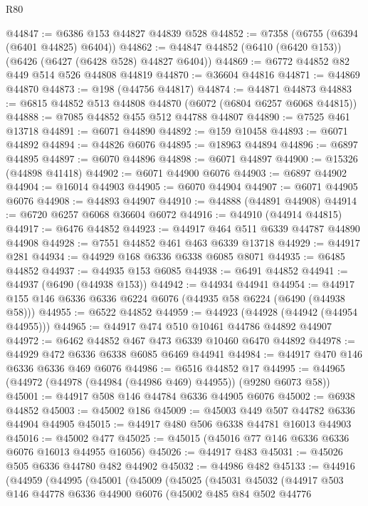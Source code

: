 \begin{lexlean}{R80}
\begin{coremodule}
@44847 := @6386 @153 @44827 @44839 @528
@44852 := @7358 (@6755 (@6394 (@6401 @44825) @6404))
@44862 := @44847 @44852 (@6410 (@6420 @153)) (@6426 (@6427 (@6428 @528) @44827 @6404))
@44869 := @6772 @44852 @82 @449 @514 @526 @44808 @44819
@44870 := @36604 @44816
@44871 := @44869 @44870
@44873 := @198 (@44756 @44817)
@44874 := @44871 @44873
@44883 := @6815 @44852 @513 @44808 @44870 (@6072 (@6804 @6257 @6068 @44815))
@44888 := @7085 @44852 @455 @512 @44788 @44807
@44890 := @7525 @461 @13718
@44891 := @6071 @44890
@44892 := @159 @10458
@44893 := @6071 @44892
@44894 := @44826 @6076
@44895 := @18963 @44894
@44896 := @6897 @44895
@44897 := @6070 @44896
@44898 := @6071 @44897
@44900 := @15326 (@44898 @41418)
@44902 := @6071 @44900 @6076
@44903 := @6897 @44902
@44904 := @16014 @44903
@44905 := @6070 @44904
@44907 := @6071 @44905 @6076
@44908 := @44893 @44907
@44910 := @44888 (@44891 @44908)
@44914 := @6720 @6257 @6068 @36604 @6072
@44916 := @44910 (@44914 @44815)
@44917 := @6476 @44852
@44923 := @44917 @464 @511 @6339 @44787 @44890 @44908
@44928 := @7551 @44852 @461 @463 @6339 @13718
@44929 := @44917 @281
@44934 := @44929 @168 @6336 @6338 @6085 @8071
@44935 := @6485 @44852
@44937 := @44935 @153 @6085
@44938 := @6491 @44852
@44941 := @44937 (@6490 (@44938 @153))
@44942 := @44934 @44941
@44954 := @44917 @155 @146 @6336 @6336 @6224 @6076 (@44935 @58 @6224 (@6490 (@44938 @58)))
@44955 := @6522 @44852
@44959 := @44923 (@44928 (@44942 (@44954 @44955)))
@44965 := @44917 @474 @510 @10461 @44786 @44892 @44907
@44972 := @6462 @44852 @467 @473 @6339 @10460 @6470 @44892
@44978 := @44929 @472 @6336 @6338 @6085 @6469 @44941
@44984 := @44917 @470 @146 @6336 @6336 @469 @6076
@44986 := @6516 @44852 @17
@44995 := @44965 (@44972 (@44978 (@44984 (@44986 @469) @44955)) (@9280 @6073 @58))
@45001 := @44917 @508 @146 @44784 @6336 @44905 @6076
@45002 := @6938 @44852
@45003 := @45002 @186
@45009 := @45003 @449 @507 @44782 @6336 @44904 @44905
@45015 := @44917 @480 @506 @6338 @44781 @16013 @44903
@45016 := @45002 @477
@45025 := @45015 (@45016 @77 @146 @6336 @6336 @6076 @16013 @44955 @16056)
@45026 := @44917 @483
@45031 := @45026 @505 @6336 @44780 @482 @44902
@45032 := @44986 @482
@45133 := @44916
    (@44959
      (@44995
        (@45001
          (@45009
            (@45025
              (@45031
                @45032
                (@44917
                  @503
                  @146
                  @44778
                  @6336
                  @44900
                  @6076
                  (@45002
                    @485
                    @84
                    @502
                    @44776

\end{coremodule}
\end{lexlean}
